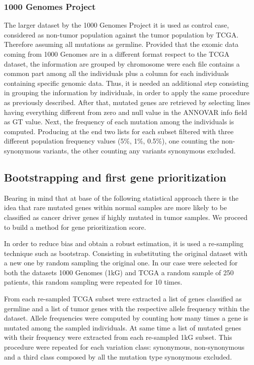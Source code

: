 \subsubsection{1000 Genomes Project}
The larger dataset by the 1000 Genomes Project it is used as control case, considered as non-tumor population against the tumor population by TCGA. Therefore assuming all mutations as germline. Provided that the exomic data coming from 1000 Genomes are in a different format respect to the TCGA dataset, the information are grouped by chromosome were each file contains a common part among all the individuals plus a column for each individuals containing specific genomic data. Thus, it is needed an additional step consisting in grouping the information by individuals, in order to apply the same procedure as previously described.
After that, mutated genes are retrieved by selecting lines having everything different from zero and null value in the ANNOVAR info field as GT value. Next, the frequency of each mutation among the individuals is computed.
Producing at the end two lists for each subset filtered with three different population frequency values (5\%, 1\%, 0.5\%), one counting the non-synonymous variants, the other counting any variants synonymous excluded.


\subsection{Bootstrapping and first gene prioritization}
Bearing in mind that at base of the following statistical approach there is the idea that rare mutated genes within normal samples are more likely to be classified as cancer driver genes if highly mutated in tumor samples. We proceed to build a method for gene prioritization score.


In order to reduce bias and obtain a robust estimation, it is used a re-sampling technique such as bootstrap. Consisting in substituting the original dataset with a new one by random sampling the original one. In our case were selected for both the datasets 1000 Genomes (1kG) and TCGA a random sample of 250 patients, this random sampling were repeated for 10 times.
 
From each re-sampled TCGA subset were extracted a list of genes classified as germline and a list of tumor genes with the respective allele frequency within the dataset. Allele frequencies were computed by counting how many times a gene is mutated among the sampled individuals. At same time a list of mutated genes with their frequency were extracted from each re-sampled 1kG subset. This procedure were repeated for each variation class: synonymous, non-synonymous and a third class composed by all the mutation type synonymous excluded.  


